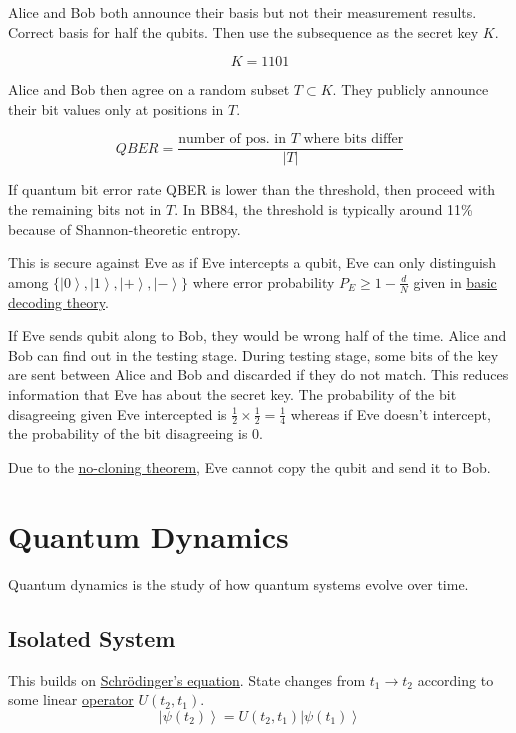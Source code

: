 \documentclass[
]{article}
\let\oldhyperref\hyperref
\renewcommand{\hyperref}[2][]{\oldhyperref[#1]{\underline{#2}}}
\providecommand{\ket}[1]{\left\lvert #1 \right\rangle}
\providecommand{\rarr}{\rightarrow}
\begin{document}
Alice and Bob both announce their basis but not their measurement results. Correct basis for half the qubits. Then use the subsequence as the secret key $K$.

\[
	K = 1101
\]

Alice and Bob then agree on a random subset $T\subset K$. They publicly announce their bit values only at positions in $T$.

\[
	QBER=\frac{\text{number of pos. in $T$ where bits differ}}{|T|}
\]

If quantum bit error rate QBER is lower than the threshold, then proceed with the remaining bits not in $T$. In BB84, the threshold is typically around 11\% because of Shannon-theoretic entropy.

This is secure against Eve as if Eve intercepts a qubit, Eve can only distinguish among $\{\ket{0},\ket{1},\ket{+},\ket{-}\}$
where error probability  $P_E\geq 1-\frac{d}{N}$ given in \hyperref[basic-decoding-theory]{basic decoding theory}.

If Eve sends qubit along to Bob, they would be wrong half of the time. Alice and Bob can find out in the testing stage. During testing stage, some bits of the key are sent between Alice and Bob and discarded if they do not match. This reduces information that Eve has about the secret key. The probability of the bit disagreeing given Eve intercepted is $\frac{1}{2}\times\frac{1}{2}=\frac{1}{4}$ whereas if Eve doesn't intercept, the probability of the bit disagreeing is $0$.

Due to the \hyperref[no-cloning-theorem]{no-cloning theorem}, Eve cannot copy the qubit and send it to Bob.



\section{Quantum Dynamics}\label{quantum-dynamics}
Quantum dynamics is the study of how quantum systems evolve over time.
\subsection{Isolated System}\label{isolated-system}

This builds on \hyperref[schruxf6dingers-equation-hamiltonian]{Schrödinger's equation}.
State changes from $t_1\rarr t_2$ according to some linear \hyperref[operators]{operator} $U(t_2, t_1)$.
\[
	\ket{\psi(t_2)}=U(t_2, t_1)\ket{\psi(t_1)}
\]
\end{document}
